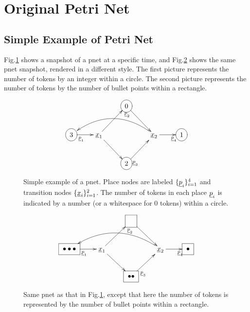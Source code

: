 \section{Original Petri Net}
\subsection{Simple Example of Petri Net}

Fig.\ref{fig-original-pnet-eg-circle}
shows a snapshot of a pnet at a specific time,
and
Fig.\ref{fig-original-pnet-eg-square}
shows the same pnet snapshot, rendered in a different style. The first picture
represents the number of tokens by an integer within a circle.
The second picture represents the number of
tokens by  the number of bullet points within
a rectangle.

\begin{figure}[h!]
$$
\xymatrix{
&&\Circle{0}\ar[rd]
\\
\Circle{3}\ar[r]_<<<{\rvp_1}
&\rvx_1\ar[ur]_>{\rvp_2}
\ar[dr]
&&\rvx_2\ar[r]_>>{\rvp_4}
\ar@/_2pc/[lll]
&\Circle{1}
\\
&&\Circle{2}\ar[ur]_<{\rvp_3}
}$$
\caption{Simple example of a pnet.
Place nodes are labeled $\{\rvp_i\}_{i=1}^{4}$ and
transition nodes $\{\rvx_i\}_{i=1}^2$.  The number of tokens in each place $\rvp_i$
is indicated by a number (or a whitespace for 0 tokens) within a circle.}
\label{fig-original-pnet-eg-circle}
\end{figure}


\begin{figure}[h!]
$$
\xymatrix{
&&\Rect{\phantom{0}}\ar[rd]
\\
\Rect{\bullet\bullet\bullet}\ar[r]_<<<{\rvp_1}
&\rvx_1\ar[ur]_>{\rvp_2}
\ar[dr]
&&\rvx_2\ar[r]_>>{\rvp_4}
\ar@/_2pc/[lll]
&\Rect{\bullet}
\\
&&\Rect{\bullet\bullet}\ar[ur]_<<{\rvp_3}
}
$$
\caption{Same pnet as that in Fig.\ref{fig-original-pnet-eg-circle},
except that here
the number of tokens is represented by the number of bullet points within a rectangle.}
\label{fig-original-pnet-eg-square}
\end{figure}

